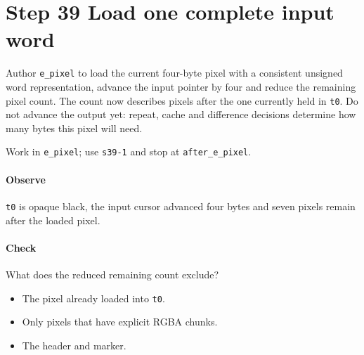 \section{Step 39 Load one complete input word}\label{qoi-s39}
Author \texttt{e\_pixel} to load the current four-byte pixel with a consistent unsigned word representation, advance the input pointer by four and reduce the remaining pixel count. The count now describes pixels after the one currently held in \texttt{t0}. Do not advance the output yet: repeat, cache and difference decisions determine how many bytes this pixel will need.

Work in \texttt{e\_pixel}; use \texttt{s39-1} and stop at \texttt{after\_e\_pixel}.

\paragraph{Observe} \texttt{t0} is opaque black, the input cursor advanced four bytes and seven pixels remain after the loaded pixel.

\paragraph{Check} What does the reduced remaining count exclude?
\begin{itemize}
  \item[A.] The pixel already loaded into \texttt{t0}.
  \item[B.] Only pixels that have explicit RGBA chunks.
  \item[C.] The header and marker.
\end{itemize}
